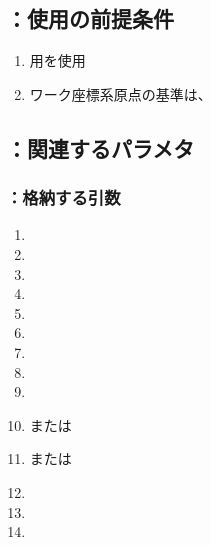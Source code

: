 \subsection{\KKeywayConerLeft：使用の前提条件}
\begin{enumerate}[label*=\sarrow]
\item \KeywayMilling 用\SideCutter を使用
\item {}ワーク座標系原点の基準は、\KeywayCenter
\end{enumerate}


\subsection{\KKeywayConerLeft：関連するパラメタ}

\subsubsection{\KKeywayConerLeft：格納する引数}
\begin{enumerate}[label*=\sarrow]
\item \PMTopOutcutExists
\item \PMAKDToleranceExists
\item \PMKeywayCornerType
\item \PMKeywayACOD
\item \PMKeywayBDOD
\item \PMKeywayPos
\item \PMKeywayWidth
\item \PMKeywayCornerR
\item \PMKeywayCornerC
\item \PMACOD または\PMTopOutcutACWidth
\item \PMBDOD または\PMTopOutcutBDWidth
\item \PMTopAlocationLength
\item \PMTopReAlocationLength
\item \PMCenterCurvatureRadius
\end{enumerate}

